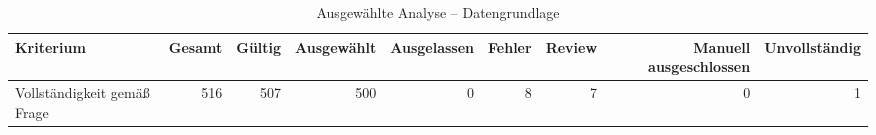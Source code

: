 \begin{table}[htbp]
\centering
\caption{Ausgewählte Analyse -- Datengrundlage}
\begin{tabular}{lrrrrrrrr}
\toprule
Kriterium & Gesamt & Gültig & Ausgewählt & Ausgelassen & Fehler & Review & Manuell ausgeschlossen & Unvollständig \\
\midrule
Vollständigkeit gemäß Frage & 516 & 507 & 500 & 0 & 8 & 7 & 0 & 1 \\
\bottomrule
\end{tabular}
\end{table}
